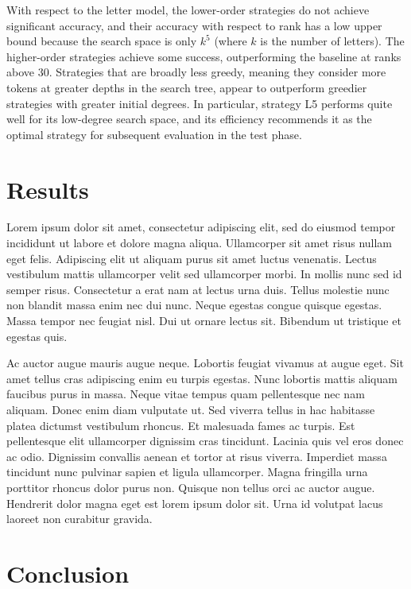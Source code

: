 \documentclass[letterpaper]{article} %
\begin{document}
\begin{NoHyper}
With respect to the letter model, the lower-order strategies do not achieve significant accuracy, and their accuracy with respect to rank has a low upper bound because the search space is only $k^5$ (where $k$ is the number of letters).
The higher-order strategies achieve some success,  outperforming the baseline at ranks above 30.
Strategies that are broadly less greedy, meaning they consider more tokens at greater depths in the search tree, appear to outperform greedier strategies with greater initial degrees.
In particular, strategy L5 performs quite well for its low-degree search space, and its efficiency recommends it as the optimal strategy for subsequent evaluation in the test phase.



\section{Results}
\label{sec:results}

Lorem ipsum dolor sit amet, consectetur adipiscing elit, sed do eiusmod tempor incididunt ut labore et dolore magna aliqua.
Ullamcorper sit amet risus nullam eget felis.
Adipiscing elit ut aliquam purus sit amet luctus venenatis.
Lectus vestibulum mattis ullamcorper velit sed ullamcorper morbi.
In mollis nunc sed id semper risus.
Consectetur a erat nam at lectus urna duis.
Tellus molestie nunc non blandit massa enim nec dui nunc.
Neque egestas congue quisque egestas.
Massa tempor nec feugiat nisl.
Dui ut ornare lectus sit.
Bibendum ut tristique et egestas quis.

Ac auctor augue mauris augue neque.
Lobortis feugiat vivamus at augue eget.
Sit amet tellus cras adipiscing enim eu turpis egestas.
Nunc lobortis mattis aliquam faucibus purus in massa.
Neque vitae tempus quam pellentesque nec nam aliquam.
Donec enim diam vulputate ut.
Sed viverra tellus in hac habitasse platea dictumst vestibulum rhoncus.
Et malesuada fames ac turpis.
Est pellentesque elit ullamcorper dignissim cras tincidunt.
Lacinia quis vel eros donec ac odio.
Dignissim convallis aenean et tortor at risus viverra.
Imperdiet massa tincidunt nunc pulvinar sapien et ligula ullamcorper.
Magna fringilla urna porttitor rhoncus dolor purus non.
Quisque non tellus orci ac auctor augue.
Hendrerit dolor magna eget est lorem ipsum dolor sit.
Urna id volutpat lacus laoreet non curabitur gravida.

\section{Conclusion}
\label{sec:conclusion}


\end{NoHyper}
\end{document}
